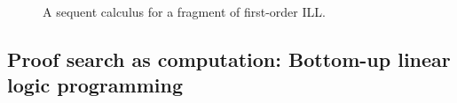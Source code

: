 \begin{figure}
  \caption{A sequent calculus for a fragment of first-order \acl{ILL}.\label{fig:seq-jill}}
\end{figure}

\subsection{Proof search as computation: Bottom-up linear logic programming}\label{sec:linear-lp}

